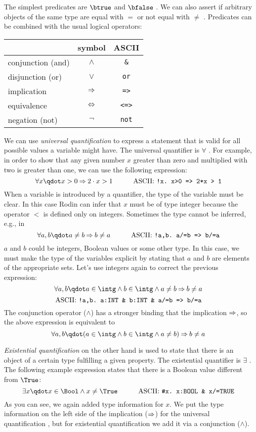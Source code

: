 The simplest predicates are $\btrue$  and $\bfalse$ .
We can also assert if arbitrary objects of the same type are equal with $=$ or not equal with $\neq$
\inascii{/=}.
Predicates can be combined with the usual logical operators:
\begin{center}
  \begin{tabular}{lcc}
                      & symbol   & ASCII \\
    \hline
    conjunction (and) & $\land$  & \texttt{\&} \\
    disjunction (or)   & $\lor$   & \texttt{or} \\
    implication       & $\mathbin\Rightarrow$  & \texttt{=>} \\
    equivalence       & $\mathbin\Leftrightarrow$  & \texttt{<=>} \\
    negation (not)    & $\lnot$  & \texttt{not} \\
  \end{tabular}
\end{center}
We can use \emph{universal quantification} to express a statement that is valid for all possible values
a variable might have. The universal quantifier is $\forall$ \inascii{!}. For example, in order to show that any given number $x$ greater than zero and multiplied with two is greater than one, we can use the following expression: 
\[ \forall x \qdot x>0 \limp 2\cdot x > 1 \lascii{!x.\ x>0\ =>\ 2*x\ >\ 1}\]
When a variable is introduced by a quantifier, the type of the variable must be clear. In this case Rodin can infer that $x$ must be of type integer because the operator $<$ is defined only on integers. Sometimes the type cannot be inferred, e.g., in
\[ \forall a,b \qdot a\neq b \limp b\neq a \lascii{!a,b.\ a/=b\ =>\ b/=a} \]
$a$ and $b$ could be integers, Boolean values or some other type.
In this case, we must make the type of the variables explicit by stating that $a$ and $b$ are elements
of the appropriate sets. Let's use integers again to correct the previous expression:
\[ \forall a,b \qdot a\in\intg \land b\in\intg \land a\neq b \limp b\neq a\]
\[ \textrm{ASCII: } \texttt{!a,b.\ a:INT \& b:INT \& a/=b => b/=a} \]
The conjunction operator ($\land$) has a stronger binding that the implication $\mathbin\Rightarrow$, so the above expression is equivalent to
\[ \forall a,b \qdot (a\in\intg \land b\in\intg \land a\neq b) \limp b\neq a\]


\emph{Existential quantification} on the other hand is used to state that there is an object of a certain type fulfilling a given property. The existential quantifier is $\exists$ \inascii{\#}. The following example expression states that there is a Boolean value different from $\True$:
\[ \exists x \qdot x\in\Bool \land x\neq\True \lascii{\#x.\ x:BOOL\ \&\ x/=TRUE} \]
As you can see, we again added type information for $x$. We put the type information on the left side of the implication ($\mathbin\Rightarrow$) for the universal quantification , but for existential quantification we add it via a conjunction ($\land$).

